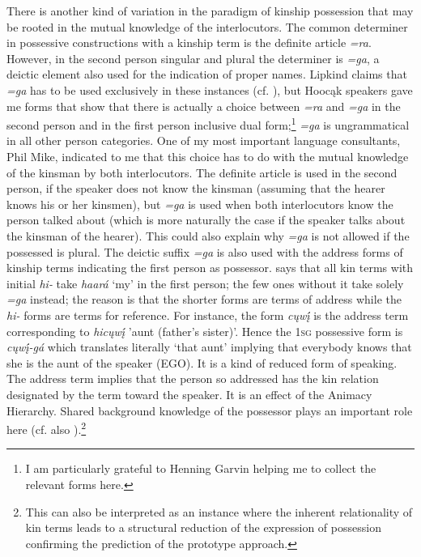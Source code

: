 \documentclass[output=paper]{LSP/langsci}
\begin{document}
There is another kind of variation in the paradigm of kinship possession that may be rooted in the mutual knowledge of the interlocutors. The common determiner in possessive constructions with a kinship term is the definite article \textit{=ra}. However, in the second person singular and plural the determiner is \textit{=ga}, a deictic element also used for the indication of proper names. Lipkind claims that \textit{=ga} has to be used exclusively in these instances (cf. \citealt[31]{Lipkind1945}), but Hoocąk speakers gave me forms that show that there is actually a choice between \textit{=ra} and \textit{=ga} in the second person and in the first person inclusive dual form;\footnote{I am particularly grateful to Henning Garvin helping me to collect the relevant forms here.} \textit{=ga} is ungrammatical in all other person categories. One of my most important language consultants, Phil Mike, indicated to me that this choice has to do with the mutual knowledge of the kinsman by both interlocutors. The definite article is used in the second person, if the speaker does not know the kinsman (assuming that the hearer knows his or her kinsmen), but \textit{=ga} is used when both interlocutors know the person talked about (which is more naturally the case if the speaker talks about the kinsman of the hearer). This could also explain why \textit{=ga} is not allowed if the possessed is plural. The deictic suffix \textit{=ga} is also used with the address forms of kinship terms indicating the first person as possessor. \citet[31]{Lipkind1945} says that all kin terms with initial \textit{hi-} take \textit{haará} `my' in the first person; the few ones without it take solely \textit{=ga} instead; the reason is that the shorter forms are terms of address while the \textit{hi-} forms are terms for reference. For instance, the form \textit{cųwį́} is the address term corresponding to \textit{hicųwį́} 'aunt (father's sister)'. Hence the \textsc{1sg} possessive form is \textit{cųwį́-gá} which translates literally `that aunt' implying that everybody knows that she is the aunt of the speaker (EGO). It is a kind of reduced form of speaking. The address term implies that the person so addressed has the kin relation designated by the term toward the speaker. It is an effect of the Animacy Hierarchy. Shared background knowledge of the possessor plays an important role here (cf. also \citealt[26f]{Heine1997}).\footnote{This can also be interpreted as an instance where the inherent relationality of kin terms leads to a structural reduction of the expression of possession confirming the prediction of the prototype approach.}
\end{document}
